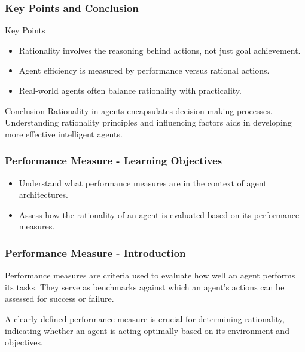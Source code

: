\documentclass[aspectratio=169]{beamer}
\begin{document}
\begin{frame}[fragile]
    \frametitle{Key Points and Conclusion}
    \begin{block}{Key Points}
        \begin{itemize}
            \item Rationality involves the reasoning behind actions, not just goal achievement.
            \item Agent efficiency is measured by performance versus rational actions.
            \item Real-world agents often balance rationality with practicality.
        \end{itemize}
    \end{block}

    \begin{block}{Conclusion}
        Rationality in agents encapsulates decision-making processes. Understanding rationality principles and influencing factors aids in developing more effective intelligent agents.
    \end{block}
\end{frame}

\begin{frame}[fragile]
    \frametitle{Performance Measure - Learning Objectives}
    \begin{itemize}
        \item Understand what performance measures are in the context of agent architectures.
        \item Assess how the rationality of an agent is evaluated based on its performance measures.
    \end{itemize}
\end{frame}

\begin{frame}[fragile]
    \frametitle{Performance Measure - Introduction}
    Performance measures are criteria used to evaluate how well an agent performs its tasks. They serve as benchmarks against which an agent's actions can be assessed for success or failure. 

    A clearly defined performance measure is crucial for determining rationality, indicating whether an agent is acting optimally based on its environment and objectives.
\end{frame}
\end{document}
